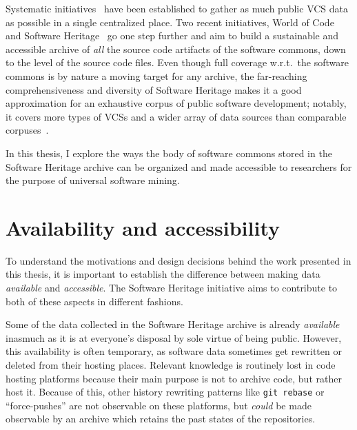 Systematic initiatives~\cite{flossmole2006,gao2007archive,mockus2009}
have been established to gather as much public \gls{VCS} data as possible in a
single centralized place. Two recent initiatives, World of
Code~\cite{mockus2019woc} and Software Heritage~\cite{swhipres2017,
swhcacm2018} go one step further and aim to build a sustainable and accessible
archive of \emph{all} the source code artifacts of the software commons, down
to the level of the source code files. Even though full coverage w.r.t.\ the
software commons is by nature a moving target for any archive, the far-reaching
comprehensiveness and diversity of Software Heritage makes it a good
approximation for an exhaustive corpus of public software development; notably,
it covers more types of \glspl{VCS} and a wider array of data sources than
comparable corpuses~\cite{ma2021world}.

In this thesis, I explore the ways the body of software commons stored in the
Software Heritage archive can be organized and made accessible to researchers
for the purpose of universal software mining.

\section{Availability and accessibility}

To understand the motivations and design decisions behind the work presented in
this thesis, it is important to establish the difference between making data
\emph{available} and \emph{accessible}.  The Software Heritage initiative aims
to contribute to both of these aspects in different fashions.

Some of the data collected in the Software Heritage archive is already
\emph{available} inasmuch as it is at everyone's disposal by sole virtue of
being public. However, this availability is often temporary, as software data
sometimes get rewritten or deleted from their hosting places. Relevant
knowledge is routinely lost in code hosting platforms because their main
purpose is not to archive code, but rather host it. Because of this, other
history rewriting patterns like \texttt{git rebase} or ``force-pushes'' are not
observable on these platforms, but \emph{could} be made observable by an
archive which retains the past states of the repositories.

